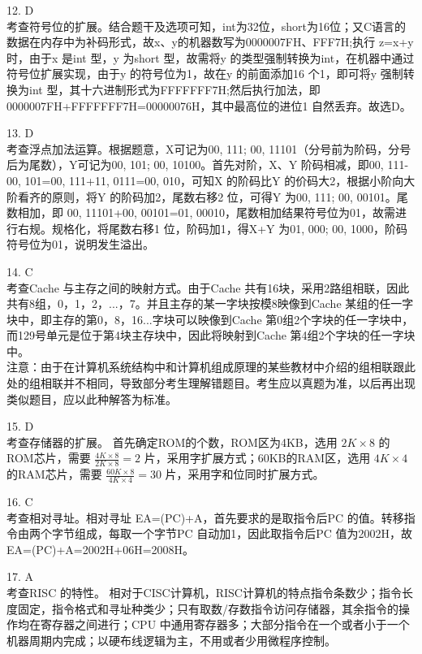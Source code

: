 12. D \\
考查符号位的扩展。结合题干及选项可知，int为32位，short为16位；又C语言的数据在内存中为补码形式，故x、y的机器数写为0000007FH、FFF7H;执行 z=x+y 时，由于x 是int 型，y 为short 型，故需将y 的类型强制转换为int，在机器中通过符号位扩展实现，由于y 的符号位为1，故在y 的前面添加16 个1，即可将y 强制转换为int 型，其十六进制形式为FFFFFFF7H;然后执行加法，即0000007FH+FFFFFFF7H=00000076H，其中最高位的进位1 自然丢弃。故选D。

13. D \\
考查浮点加法运算。根据题意，X可记为00, 111; 00, 11101（分号前为阶码，分号后为尾数），Y可记为00, 101; 00, 10100。首先对阶，X、Y 阶码相减，即00, 111-00, 101=00, 111+11, 0111=00, 010，可知X 的阶码比Y 的价码大2，根据小阶向大阶看齐的原则，将Y 的阶码加2，尾数右移2 位，可得Y 为00, 111; 00, 00101。尾数相加，即 00, 11101+00, 00101=01, 00010，尾数相加结果符号位为01，故需进行右规。规格化，将尾数右移1 位，阶码加1，得X+Y 为01, 000; 00, 1000，阶码符号位为01，说明发生溢出。

14. C \\
考查Cache 与主存之间的映射方式。由于Cache 共有16块，采用2路组相联，因此共有8组，0，1，2，...，7。并且主存的某一字块按模8映像到Cache 某组的任一字块中，即主存的第0，8，16...字块可以映像到Cache 第0组2个字块的任一字块中，而129号单元是位于第4块主存块中，因此将映射到Cache 第4组2个字块的任一字块中。 \\
注意：由于在计算机系统结构中和计算机组成原理的某些教材中介绍的组相联跟此处的组相联并不相同，导致部分考生理解错题目。考生应以真题为准，以后再出现类似题目，应以此种解答为标准。

15. D \\
考查存储器的扩展。
首先确定ROM的个数，ROM区为4KB，选用 $2K\times8$ 的ROM芯片，需要 $\frac{4K\times8}{2K\times8}=2$ 片，采用字扩展方式；60KB的RAM区，选用 $4K\times4$ 的RAM芯片，需要 $\frac{60K\times8}{4K\times4}=30$ 片，采用字和位同时扩展方式。

16. C \\
考查相对寻址。相对寻址 EA=(PC)+A，首先要求的是取指令后PC 的值。转移指令由两个字节组成，每取一个字节PC 自动加1，因此取指令后PC 值为2002H，故EA=(PC)+A=2002H+06H=2008H。

17. A \\
考查RISC 的特性。
相对于CISC计算机，RISC计算机的特点指令条数少；指令长度固定，指令格式和寻址种类少；只有取数/存数指令访问存储器，其余指令的操作均在寄存器之间进行；CPU 中通用寄存器多；大部分指令在一个或者小于一个机器周期内完成；以硬布线逻辑为主，不用或者少用微程序控制。

